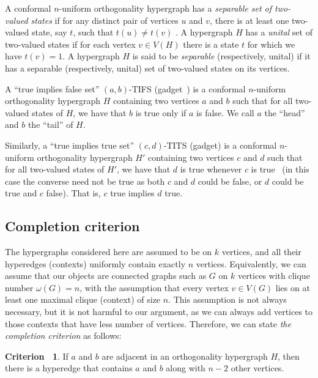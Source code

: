 \documentclass[%
12pt,
prereprint,
showpacs,
showkeys,
preprintnumbers,
amsmath,amssymb,
aps,
pra,
longbibliography,
notitlepage
]{revtex4-1}
\theoremstyle{definition}
\newtheorem{criterion}[theorem]{{\color{THM}Criterion\ }}
\begin{document}
	
	A conformal $n$-uniform orthogonality hypergraph has a \emph{separable set of two-valued states} if for any distinct pair of vertices $u$ and $v$, there is at least one two-valued state, say $t$, such that $t( u ) \neq t(v)$ \cite{svozil-tkadlec}. A hypergraph $H$ has a \emph{unital} set of two-valued states if for each vertex $v \in V(H)$ there is a state $t$ for which we have $t(v)=1$. A hypergraph $H$ is said to be \emph{separable} (respectively, unital) if it has a separable (respectively, unital)
set of two-valued states on its vertices.
	
	A ``true implies false set'' $(a,b)$-TIFS (gadget~\cite{tutte_1954,SZABO2009436,Ramanathan-18}) is a conformal $n$-uniform orthogonality hypergraph $H$ containing two vertices $a$ and $b$  such that for all two-valued states of $H$, we have that $b$ is true only if $a$ is false.
	We call $a$ the ``head'' and $b$ the ``tail'' of $H$.
	
	
	Similarly, a ``true implies true set'' $(c,d)$-TITS (gadget) is a conformal $n$-uniform orthogonality hypergraph $H'$ containing two vertices $c$ and $d$ such that for all two-valued states of $H'$, we have that $d$ is true whenever $c$ is true~\cite{2018-minimalYIYS}
	(in this case the converse need not be true as both $c$ and $d$ could be false, or $d$ could be true and $c$ false). That is, $c$ true implies $d$ true.
	
	\subsection{Completion criterion}
	
	The hypergraphs considered here are assumed to be on $k$ vertices, and all their hyperedges (contexts) uniformly contain exactly $n$ vertices. Equivalently, we can assume that our objects are connected graphs such as $G$ on $k$ vertices with clique number $\omega (G)=n$, with the assumption that every vertex $v\in V(G)$ lies on at least one maximal clique (context) of size $n$. This assumption is not always necessary, but it is not harmful to our argument, as we can always add vertices to those contexts that have less number of vertices. Therefore, we can state \emph{the completion criterion} as follows:
	
	\begin{criterion}\label{completion}
		If $a$ and $b$ are adjacent in an orthogonality hypergraph $H$, then there is a hyperedge that contains $a$ and $b$ along with $n-2$ other vertices.
	\end{criterion}
	
\end{document}
